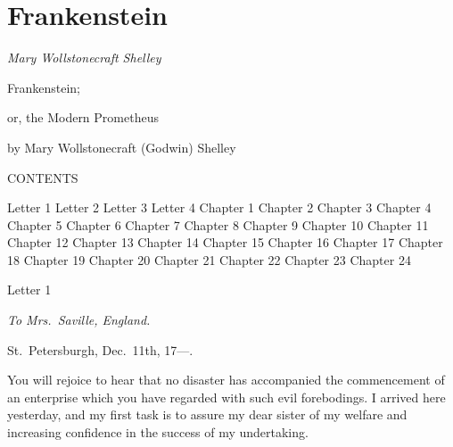 \documentclass[12pt,openright]{book}
\begin{document}

%



\mainmatter
\pagestyle{fancy}


\chapter*{Frankenstein}

\textit{Mary Wollstonecraft Shelley}

Frankenstein;

or, the Modern Prometheus

by Mary Wollstonecraft (Godwin) Shelley

CONTENTS

Letter 1 Letter 2 Letter 3 Letter 4 Chapter 1 Chapter 2 Chapter 3 Chapter 4 Chapter 5 Chapter 6 Chapter 7 Chapter 8 Chapter 9 Chapter 10 Chapter 11 Chapter 12 Chapter 13 Chapter 14 Chapter 15 Chapter 16 Chapter 17 Chapter 18 Chapter 19 Chapter 20 Chapter 21 Chapter 22 Chapter 23 Chapter 24

Letter 1

\textit{To Mrs. Saville, England.}

St. Petersburgh, Dec. 11th, 17—.

You will rejoice to hear that no disaster has accompanied the commencement of an enterprise which you have regarded with such evil forebodings. I arrived here yesterday, and my first task is to assure my dear sister of my welfare and increasing confidence in the success of my undertaking.
\end{document}
